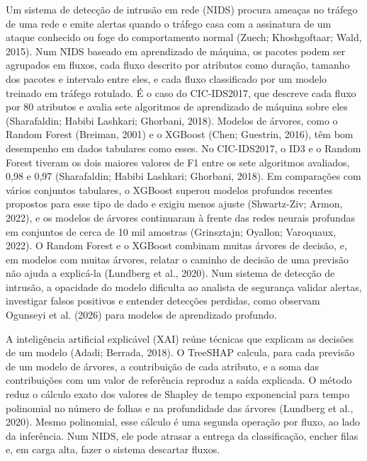 \documentclass[
  article,
  12pt,
  oneside,
  a4paper,
  english,
  brazil
]{abntex2}
\begin{document}
Um sistema de detecção de intrusão em rede (NIDS) procura ameaças no tráfego de uma rede e emite
alertas quando o tráfego casa com a assinatura de um ataque conhecido ou foge do comportamento
normal (Zuech; Khoshgoftaar; Wald, 2015). Num NIDS baseado em aprendizado de máquina, os pacotes podem ser
agrupados em fluxos, cada fluxo descrito por atributos como duração, tamanho dos pacotes e intervalo
entre eles, e cada fluxo classificado por um modelo treinado em tráfego rotulado. É o caso do
CIC-IDS2017, que descreve cada fluxo por 80 atributos e avalia sete algoritmos de aprendizado de
máquina sobre eles (Sharafaldin; Habibi Lashkari; Ghorbani, 2018). Modelos de árvores, como o
Random Forest (Breiman, 2001) e o XGBoost (Chen; Guestrin, 2016), têm bom desempenho em dados
tabulares como esses. No CIC-IDS2017, o ID3 e o Random Forest tiveram os dois maiores valores de F1
entre os sete algoritmos avaliados, 0,98 e 0,97 (Sharafaldin; Habibi Lashkari; Ghorbani, 2018). Em
comparações com vários conjuntos tabulares, o XGBoost superou modelos profundos recentes propostos
para esse tipo de dado e exigiu menos ajuste (Shwartz-Ziv; Armon, 2022), e os modelos de árvores
continuaram à frente das redes neurais profundas em conjuntos de cerca de 10 mil amostras
(Grinsztajn; Oyallon; Varoquaux, 2022). O Random Forest e o XGBoost combinam muitas árvores de
decisão, e, em modelos com muitas árvores, relatar o caminho de decisão de uma previsão não ajuda a
explicá-la (Lundberg et al., 2020). Num sistema de detecção de intrusão, a opacidade do modelo
dificulta ao analista de segurança validar alertas, investigar falsos positivos e entender
detecções perdidas, como observam Ogunseyi et al. (2026) para modelos de aprendizado profundo.

A inteligência artificial explicável (XAI) reúne técnicas que explicam as decisões de um modelo
(Adadi; Berrada, 2018). O TreeSHAP calcula, para cada previsão de um modelo de árvores, a contribuição de cada atributo, e a
soma das contribuições com um valor de referência reproduz a saída explicada. O método reduz o
cálculo exato dos valores de Shapley de tempo exponencial para tempo polinomial no número de folhas
e na profundidade das árvores (Lundberg et al., 2020). Mesmo polinomial, esse cálculo é uma segunda
operação por fluxo, ao lado da inferência. Num NIDS, ele pode atrasar a entrega da classificação,
encher filas e, em carga alta, fazer o sistema descartar fluxos.
\end{document}
